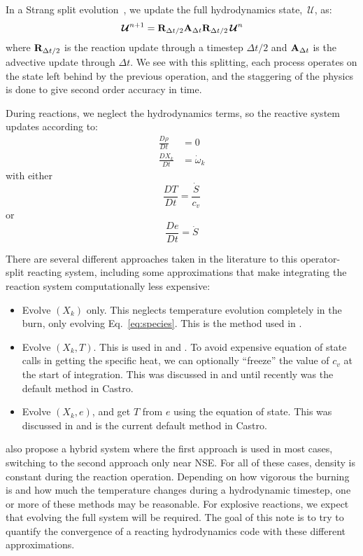 \documentclass[times,preprint]{aastex631}
\newcommand{\castro}{{\sf Castro}}
\newcommand{\omegadot}{\dot{\omega}}
\newcommand{\Sdot}{\dot{S}}
\newcommand{\Uc}{{\,\bm{\mathcal{U}}}}
\begin{document}
In a Strang split evolution~\citep{strang:1968}, we update the full
hydrodynamics state, $\Uc$, as:
\begin{equation}
  \Uc^{n+1} = {\bf R}_{\Delta t/2} {\bf A}_{\Delta t} {\bf R}_{\Delta t/2} \Uc^n
\end{equation}
where ${\bf R}_{\Delta t/2}$ is the reaction update through a timestep
$\Delta t/2$ and ${\bf A}_{\Delta t}$ is the advective update through
$\Delta t$.  We see with this splitting, each process operates on the
state left behind by the previous operation, and the staggering of the
physics is done to give second order accuracy in time.

During reactions, we neglect the hydrodynamics terms,
so the reactive system updates according to:
\begin{align}
\frac{D\rho}{Dt} &= 0 \\
\frac{DX_k}{Dt} &= \omegadot_k \label{eq:species}
\end{align}
with either
\begin{equation}
\frac{DT}{Dt} = \frac{\Sdot}{c_v}
\end{equation}
or
\begin{equation}
\frac{De}{Dt} = \Sdot
\end{equation}

There are several different approaches taken in the literature to
this operator-split reacting system, including some approximations
that make integrating the reaction system computationally less expensive:
\begin{itemize}
\item Evolve $(X_k)$ only.  This neglects temperature evolution
  completely in the burn, only evolving Eq.~\ref{eq:species}.  This is
  the method used in \citet{flash}.

\item Evolve $(X_k, T)$.   This is used in \cite{Pakmor:2012} and
  \cite{Garcia-Senz:2013}.  To avoid expensive equation of state calls
  in getting the specific heat, we can optionally ``freeze'' the value
  of $c_v$ at the start of integration.  This was discussed in \cite{Bell:2004} and
  until recently was the default method in \castro.

\item Evolve $(X_k, e)$, and get $T$ from $e$ using the equation of
  state.  This was discussed in \citet{fma} and is the current default
  method in \castro.
\end{itemize}
\cite{Raskin:2010} also propose a hybrid system where the first approach is
used in most cases, switching to the second approach only near NSE.
For all of these cases, density is constant during the reaction operation.
Depending on how vigorous the burning is and how much the temperature
changes during a hydrodynamic timestep, one or more of these
methods may be reasonable.  For explosive reactions, we expect
that evolving the full system will be required.  The goal of this
note is to try to quantify the convergence of a reacting hydrodynamics
code with these different approximations.
\end{document}
